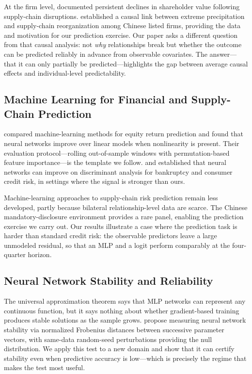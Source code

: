 \documentclass[12pt]{article}
\begin{document}
At the firm level, \citet{hendricks2005empirical} documented persistent
declines in shareholder value following supply-chain disruptions.
\citet{original2024climate} established a causal link between extreme
precipitation and supply-chain reorganization among Chinese listed firms,
providing the data and motivation for our prediction exercise.  Our paper
asks a different question from that causal analysis: not \emph{why}
relationships break but whether the outcome can be predicted reliably in
advance from observable covariates.  The answer---that it can only partially
be predicted---highlights the gap between average causal effects and
individual-level predictability.

\subsection{Machine Learning for Financial and Supply-Chain Prediction}

\citet{gu2020empirical} compared machine-learning methods for equity return
prediction and found that neural networks improve over linear models when
nonlinearity is present.  Their evaluation protocol---rolling out-of-sample
windows with permutation-based feature importance---is the template we
follow.  \citet{altman1994neural} and \citet{khandani2010consumer}
established that neural networks can improve on discriminant analysis
for bankruptcy and consumer credit risk, in settings where the signal
is stronger than ours.

Machine-learning approaches to supply-chain risk prediction remain less
developed, partly because bilateral relationship-level data are scarce.
The Chinese mandatory-disclosure environment provides a rare panel, enabling
the prediction exercise we carry out.  Our results illustrate a case where
the prediction task is harder than standard credit risk: the observable
predictors leave a large unmodeled residual, so that an MLP and a logit
perform comparably at the four-quarter horizon.

\subsection{Neural Network Stability and Reliability}

The universal approximation theorem \citep{hornik1989multilayer} says that
MLP networks can represent any continuous function, but it says nothing about
whether gradient-based training produces stable solutions as the sample
grows.  \citet{stability2024framework} propose measuring neural network
stability via normalized Frobenius distances between successive parameter
vectors, with same-data random-seed perturbations providing the null
distribution.  We apply this test to a new domain and show that it can
certify stability even when predictive accuracy is low---which is precisely
the regime that makes the test most useful.
\end{document}
